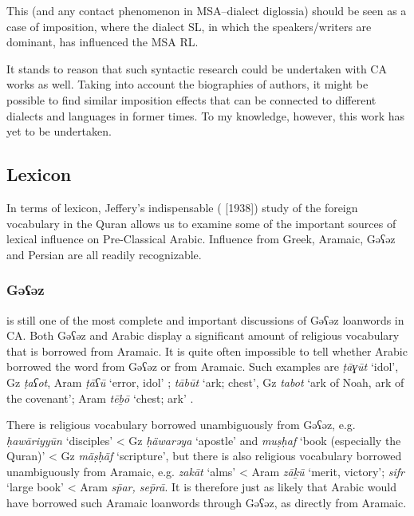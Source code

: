 \documentclass[output=paper]{langsci/langscibook}
\begin{document}
This (and any contact phenomenon in MSA–dialect diglossia) should be seen as a case of imposition, where the dialect SL, in which the speakers/writers are dominant, has influenced the MSA RL. 

It stands to reason that such syntactic research could be undertaken with CA works as well. Taking into account the biographies of authors, it might be possible to find similar imposition effects that can be connected to different dialects and languages in former times. To my knowledge, however, this work has yet to be undertaken.

\subsection{Lexicon}

In terms of lexicon, Jeffery’s indispensable (\citeyear{Jeffrey2007} [1938]) study of the foreign vocabulary in the Quran allows us to examine some of the important sources of lexical influence on Pre-Classical Arabic. Influence from Greek, Aramaic, Gəʕəz and Persian are all readily recognizable. 

\subsubsection{\label{bkm:Ref13224677}Gəʕəz}

\citet{Nöldeke1910} is still one of the most complete and important discussions of Gəʕəz loanwords in CA. Both Gəʕəz and Arabic display a significant amount of religious vocabulary that is borrowed from Aramaic. It is quite often impossible to tell whether Arabic borrowed the word from Gəʕəz or from Aramaic. Such examples are \textit{ṭāɣūt} ‘idol’, Gz \textit{ṭaʕot}, Aram \textit{ṭāʕū} ‘error, idol’ \citep[48]{Nöldeke1910}; \textit{tābūt} ‘ark; chest’, Gz \textit{tabot} ‘ark of Noah, ark of the covenant’; Aram \textit{tēḇō} ‘chest; ark’ \citep[49]{Nöldeke1910}.

There is religious vocabulary borrowed unambiguously from Gəʕəz, e.g. \textit{ḥawāriyyūn} ‘disciples’ < Gz \textit{ḥäwarəya} ‘apostle’ and \textit{muṣḥaf} ‘book (especially the Quran)’ < Gz \textit{mäṣḥäf} ‘scripture’, but there is also religious vocabulary borrowed unambiguously from Aramaic, e.g. \textit{zakāt} ‘alms’ < Aram \textit{zāḵū} ‘merit, victory’; \textit{sifr} ‘large book’ < Aram \textit{s\={p}ar, se\={p}rā}. It is therefore just as likely that Arabic would have borrowed such Aramaic loanwords through Gəʕəz, as directly from Aramaic.
\end{document}

